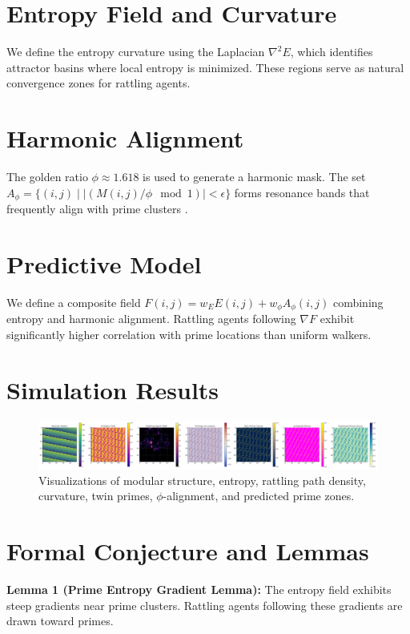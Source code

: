\documentclass[12pt]{article}
\begin{document}
\section{Entropy Field and Curvature}
We define the entropy curvature using the Laplacian $\nabla^2 E$, which identifies attractor basins where local entropy is minimized. These regions serve as natural convergence zones for rattling agents.

\section{Harmonic Alignment}
The golden ratio $\phi \approx 1.618$ is used to generate a harmonic mask. The set $A_\phi = \{(i,j) \mid |(M(i,j)/\phi \mod 1)| < \epsilon\}$ forms resonance bands that frequently align with prime clusters \cite{lagarias2000pi}.

\section{Predictive Model}
We define a composite field $F(i,j) = w_E E(i,j) + w_\phi A_\phi(i,j)$ combining entropy and harmonic alignment. Rattling agents following $\nabla F$ exhibit significantly higher correlation with prime locations than uniform walkers.

\section{Simulation Results}
\begin{figure}[h!]
\centering
\includegraphics[width=\textwidth]{modular_prime_rattling_analysis.png}
\caption{Visualizations of modular structure, entropy, rattling path density, curvature, twin primes, $\phi$-alignment, and predicted prime zones.}
\end{figure}

\section{Formal Conjecture and Lemmas}
\textbf{Lemma 1 (Prime Entropy Gradient Lemma):}
The entropy field exhibits steep gradients near prime clusters. Rattling agents following these gradients are drawn toward primes.
\end{document}
